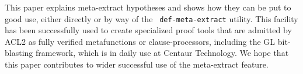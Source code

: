 \begin{comment}
[Old comment] One or both of us will write this.  Maybe we'll wait
  till a draft of the rest is written, so that we can hit the high
  points here.  Any ideas about future work?  Any lessons learned?
  (It would be cool if some application would likely have been much
  more difficult to carry out without this.)

[Matt] As far as I'm concerned we can delete this comment, but I'm
leaving it here for now in case Sol thinks we need to do more to
address some of what's in the paragraph above.
\end{comment}

\begin{comment}
Is there a grep command we can run in books showing/ that we use
    meta-extract?  I tried

\begin{verbatim}
time fgrep --include='*.lisp' -ri meta-extract . | fgrep -v system/doc/acl2-doc.lisp
\end{verbatim}

\noindent but it includes things like {\tt
boundrw-ev-meta-extract-contextual-facts} and {\tt
ctx-ev-meta-extract-contextual-facts}, which I don't understand.

[Sol] These are macros for the universally-quantified hyps produced by
{\tt def-meta-extract}.  I think that's a good way to look for the
books that define metafunctions/clause-processors using meta-extract;
I did something like that to find examples for Section
\ref{sec:applications}.

[Matt] Thanks.  Perhaps you'd be willing to run that command and,
based on your understanding of the output, add a few words about how
the numbers from the output show that meta-extract is being used.  But
feel free not to bother, of course.

Below is an initial stab at the conclusion by Matt, which undoubtedly
could be improved.  Maybe you can say a bit more, at a high level,
    about meta-extract at Centaur (even if only referring back to the
    applications section).
\end{comment}

This paper explains meta-extract hypotheses and shows how they can be
put to good use, either directly or by way of the {\tt
  def-meta-extract} utility.
This
facility has been successfully used to create specialized proof tools
that are admitted by ACL2 as fully verified metafunctions or
clause-processors, including the GL bit-blasting framework, which is
in daily use at Centaur Technology.  We hope that this paper
contributes to wider successful use of the meta-extract feature.
